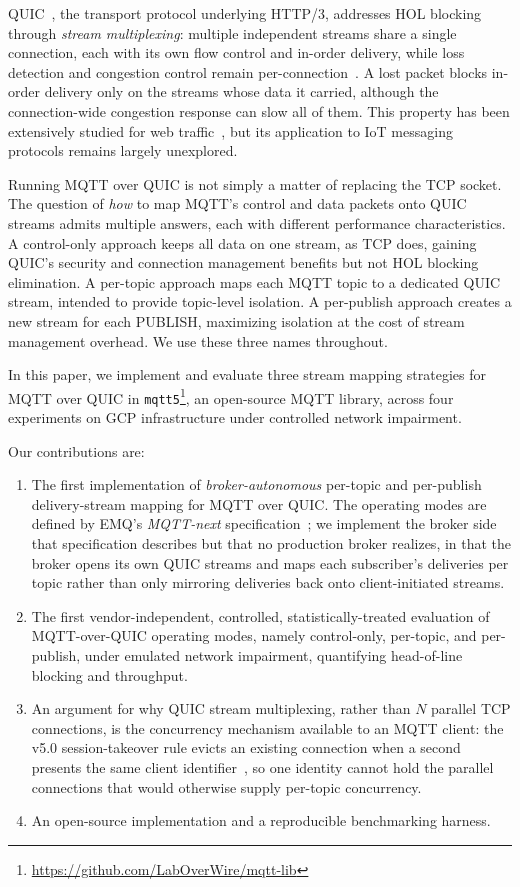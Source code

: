 \documentclass[a4paper,fleqn]{cas-dc}
\begin{document}
QUIC~\cite{rfc9000}, the transport protocol underlying HTTP/3, addresses HOL blocking through \emph{stream multiplexing}: multiple independent streams share a single connection, each with its own flow control and in-order delivery, while loss detection and congestion control remain per-connection~\cite{rfc9002}. A lost packet blocks in-order delivery only on the streams whose data it carried, although the connection-wide congestion response can slow all of them. This property has been extensively studied for web traffic~\cite{langley2017quic, kakhki2017quic, marx2020hol, yu2021quic}, but its application to IoT messaging protocols remains largely unexplored.

Running MQTT over QUIC is not simply a matter of replacing the TCP socket. The question of \emph{how} to map MQTT's control and data packets onto QUIC streams admits multiple answers, each with different performance characteristics. A control-only approach keeps all data on one stream, as TCP does, gaining QUIC's security and connection management benefits but not HOL blocking elimination. A per-topic approach maps each MQTT topic to a dedicated QUIC stream, intended to provide topic-level isolation. A per-publish approach creates a new stream for each PUBLISH, maximizing isolation at the cost of stream management overhead. We use these three names throughout.

In this paper, we implement and evaluate three stream mapping strategies for MQTT over QUIC in \texttt{mqtt5}\footnote{\url{https://github.com/LabOverWire/mqtt-lib}}, an open-source MQTT library, across four experiments on GCP infrastructure under controlled network impairment.

Our contributions are:
\begin{enumerate}
\item The first implementation of \emph{broker-autonomous} per-topic and per-publish delivery-stream mapping for MQTT over QUIC. The operating modes are defined by EMQ's \emph{MQTT-next} specification~\cite{yang2024mqttnext}; we implement the broker side that specification describes but that no production broker realizes, in that the broker opens its own QUIC streams and maps each subscriber's deliveries per topic rather than only mirroring deliveries back onto client-initiated streams.
\item The first vendor-independent, controlled, statistically-treated evaluation of MQTT-over-QUIC operating modes, namely control-only, per-topic, and per-publish, under emulated network impairment, quantifying head-of-line blocking and throughput.
\item An argument for why QUIC stream multiplexing, rather than $N$ parallel TCP connections, is the concurrency mechanism available to an MQTT client: the v5.0 session-takeover rule evicts an existing connection when a second presents the same client identifier~\cite{mqtt-v5-spec}, so one identity cannot hold the parallel connections that would otherwise supply per-topic concurrency.
\item An open-source implementation and a reproducible benchmarking harness.
\end{enumerate}
\end{document}
